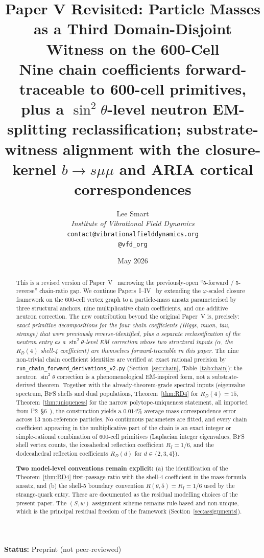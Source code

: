 \documentclass[12pt]{article}
\title{Paper V Revisited: Particle Masses as a Third Domain-Disjoint Witness on the 600-Cell\\[6pt]
\large Nine chain coefficients forward-traceable to 600-cell primitives, plus a $\sin^2\theta$-level neutron EM-splitting reclassification;
substrate-witness alignment with the closure-kernel $b\to s\mu\mu$ and ARIA cortical correspondences}
\author{%
  Lee Smart\\[4pt]
  \textit{Institute of Vibrational Field Dynamics}\\[2pt]
  \texttt{contact@vibrationalfielddynamics.org}\\[2pt]
  \texttt{@vfd\_org}%
}
\date{May 2026}
\newcommand{\phig}{\varphi}
\begin{document}
\maketitle

\noindent\textbf{Status:} Preprint (not peer-reviewed)

\begin{abstract}
This is a revised version of Paper~V~\citep{SmartV} narrowing the previously-open ``5-forward / 5-reverse'' chain-ratio gap. We continue Papers~I--IV~\citep{SmartI, SmartII, SmartIII, SmartIV} by extending the $\phig$-scaled closure framework on the 600-cell vertex graph to a particle-mass ansatz parameterised by three structural anchors, nine multiplicative chain coefficients, and one additive neutron correction. The new contribution beyond the original Paper~V is, precisely: \emph{exact primitive decompositions for the four chain coefficients (Higgs, muon, tau, strange) that were previously reverse-identified, plus a separate reclassification of the neutron entry as a $\sin^2\theta$-level EM correction whose two structural inputs ($\alpha$, the $R_D(4)$ shell-4 coefficient) are themselves forward-traceable in this paper}. The nine non-trivial chain coefficient identities are verified at exact rational precision by \texttt{run\_chain\_forward\_derivations\_v2.py} (Section~\ref{sec:chain}, Table~\ref{tab:chain}); the neutron $\sin^2\theta$ correction is a phenomenological EM-inspired form, not a substrate-derived theorem. Together with the already-theorem-grade spectral inputs (eigenvalue spectrum, BFS shells and dual populations, Theorem~\ref{thm:RD4} for $R_D(4) = 15$, Theorem~\ref{thm:uniqueness} for the narrow polytope-uniqueness statement, all imported from P2~\S 6~\citep{CascadeAlgSubstrate}), the construction yields a $0.014\%$ average mass-correspondence error across 13 non-reference particles. No continuous parameters are fitted, and every chain coefficient appearing in the multiplicative part of the chain is an exact integer or simple-rational combination of 600-cell primitives (Laplacian integer eigenvalues, BFS shell vertex counts, the icosahedral reflection coefficient $R_I = 1/6$, and the dodecahedral reflection coefficients $R_D(d)$ for $d \in \{2, 3, 4\}$).

\medskip
\noindent\textbf{Two model-level conventions remain explicit:}
(a) the identification of the Theorem~\ref{thm:RD4} first-passage ratio with the shell-4 coefficient in the mass-formula ansatz, and (b) the shell-5 boundary convention $R(\theta, 5) = R_I = 1/6$ used by the strange-quark entry. These are documented as the residual modelling choices of the present paper. The $(S,w)$ assignment scheme remains rule-based and non-unique, which is the principal residual freedom of the framework (Section~\ref{sec:assignments}).


\end{abstract}
\end{document}
